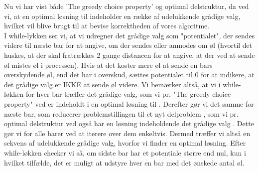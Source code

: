 Nu vi har vist både 'The greedy choice property' og optimal delstruktur, da ved vi, at en optimal løsning til  indeholder en række af udelukkende grådige valg, hvilket vil blive brugt til at bevise korrektheden af vores algoritme.\\
I while-lykken ser vi, at vi udregner det grådige valg som "potentialet", der sendes videre til næste bar for at angive, om der sendes eller anmodes om øl (hvortil det huskes, at der skal fratrækkes 2 gange distancen for at angive, at der ved at sende øl mistes øl i processen). Hvis at det koster mere øl at sende en bars overskydende øl, end det har i overskud, sættes potentialet til 0 for at indikere, at det grådige valg er IKKE at sende øl videre.
Vi bemærker altså, at vi i while-løkken for hver bar træffer det grådige valg, som vi pr. "The greedy choice property" ved er indeholdt i en optimal løsning til . Derefter gør vi det samme for næste bar, som reducerer problemstillingen til et nyt delproblem , som vi pr. optimal delstruktur ved også har en løsning indeholdende det grådige valg . Dette gør vi for alle barer ved at iterere over dem enkeltvis. Dermed træffer vi altså en sekvens af udelukkende grådige valg, hvorfor vi finder en optimal løsning.
Efter while-løkken checker vi så, om sidste bar har et potentiale større end nul, kun i hvilket tilfælde, det er muligt at udstyre hver en bar med det ønskede antal øl. 

